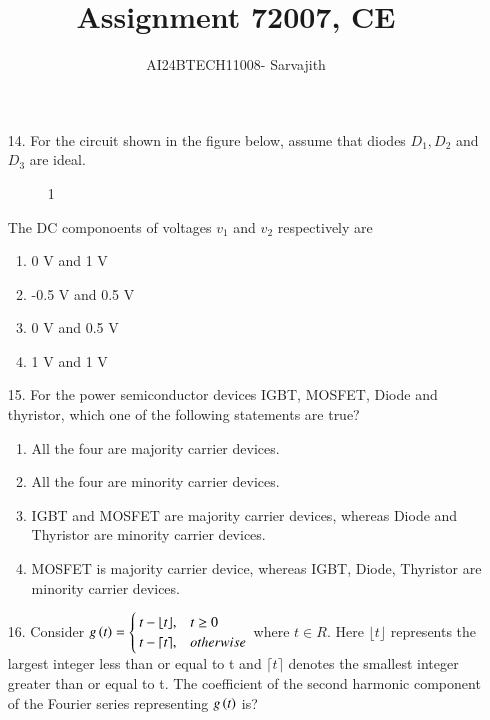 \documentclass[journal]{IEEEtran}
\begin{document}

\vspace{3cm}


\author{AI24BTECH11008- Sarvajith
}
\title{Assignment 7}
{\let\newpage\relax\maketitle}
\title{2007, CE}
\renewcommand{\thefigure}{\theenumi}
\renewcommand{\thetable}{\theenumi}
\setlength{\intextsep}{10pt} %
\renewcommand{\thetable}{\theenumi}
\begin{enumerate}
    \item[14.] For the circuit shown in the figure below, assume that diodes $D_1, D_2$ and $D_3$ are ideal.
    \begin{figure}[!ht]
        \centering
        \caption{1}
    \end{figure}
    The DC componoents of voltages $v_1$ and $v_2$ respectively are
    \begin{enumerate}[label=(\Alph*)]
        \item 0 V and 1 V
        \item -0.5 V and 0.5 V
        \item 0 V and 0.5 V
        \item 1 V and 1 V
    \end{enumerate}
    \item[15.] For the power semiconductor devices IGBT, MOSFET, Diode and thyristor, which one of the following statements are true?
    \begin{enumerate}[label=(\Alph*)]
        \item All the four are majority carrier devices.
        \item All the four are minority carrier devices.
        \item IGBT and MOSFET are majority carrier devices, whereas Diode and Thyristor are minority carrier devices.
        \item MOSFET is majority carrier device, whereas IGBT, Diode, Thyristor are minority carrier devices.
    \end{enumerate}
    \item[16.] Consider $g\left(t\right)=\begin{cases}t-\lfloor t \rfloor, & t\geq 0\\ t-\lceil t \rceil, & otherwise \end{cases}$ where $t \in R$. Here $\lfloor t \rfloor$ represents the largest integer less than or equal to t and  $\lceil t \rceil$ denotes the smallest integer greater than or equal to t. The coefficient of the second harmonic component of the Fourier series representing $g\left(t\right)$ is?

\end{enumerate}
\end{document}
